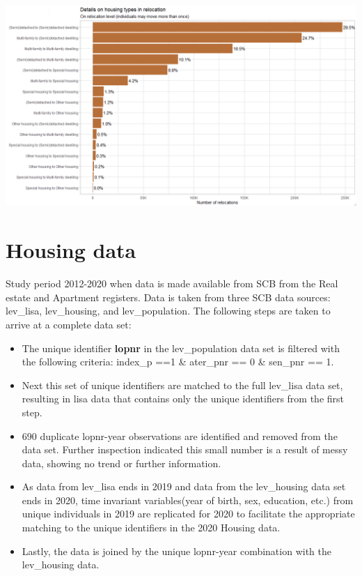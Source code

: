 \documentclass[
]{book}
\begin{document}
\includegraphics[width=1\linewidth]{output/figures/no_relocations_red}

\hypertarget{housing-data}{%
\chapter{Housing data}\label{housing-data}}

Study period 2012-2020 when data is made available from SCB from the Real estate and Apartment registers. Data is taken from three SCB data sources: lev\_lisa, lev\_housing, and lev\_population. The following steps are taken to arrive at a complete data set:

\begin{itemize}
\item
  The unique identifier \textbf{lopnr} in the lev\_population data set is filtered with the following criteria: index\_p ==1 \& ater\_pnr == 0 \& sen\_pnr == 1.
\item
  Next this set of unique identifiers are matched to the full lev\_lisa data set, resulting in lisa data that contains only the unique identifiers from the first step.
\item
  690 duplicate lopnr-year observations are identified and removed from the data set. Further inspection indicated this small number is a result of messy data, showing no trend or further information.
\item
  As data from lev\_lisa ends in 2019 and data from the lev\_housing data set ends in 2020, time invariant variables(year of birth, sex, education, etc.) from unique individuals in 2019 are replicated for 2020 to facilitate the appropriate matching to the unique identifiers in the 2020 Housing data.
\item
  Lastly, the data is joined by the unique lopnr-year combination with the lev\_housing data.
\end{itemize}
\end{document}
